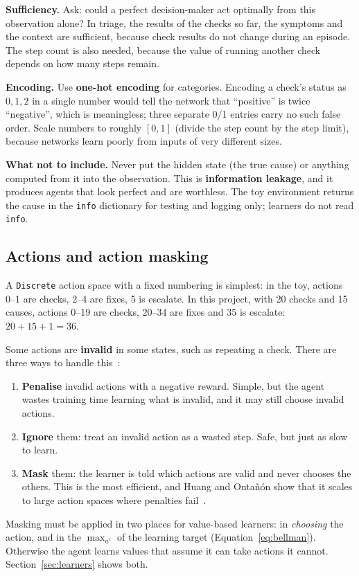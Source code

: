 \documentclass[11pt,a4paper]{article}
\begin{document}
\textbf{Sufficiency.} Ask: could a perfect decision-maker act optimally from this observation alone? In triage, the results of the checks so far, the symptoms and the context are sufficient, because check results do not change during an episode. The step count is also needed, because the value of running another check depends on how many steps remain.

\textbf{Encoding.} Use \textbf{one-hot encoding} for categories. Encoding a check's status as $0, 1, 2$ in a single number would tell the network that ``positive'' is twice ``negative'', which is meaningless; three separate 0/1 entries carry no such false order. Scale numbers to roughly $[0, 1]$ (divide the step count by the step limit), because networks learn poorly from inputs of very different sizes.

\textbf{What not to include.} Never put the hidden state (the true cause) or anything computed from it into the observation. This is \textbf{information leakage}, and it produces agents that look perfect and are worthless. The toy environment returns the cause in the \texttt{info} dictionary for testing and logging only; learners do not read \texttt{info}.

\subsection{Actions and action masking}
\label{sec:masking}
A \texttt{Discrete} action space with a fixed numbering is simplest: in the toy, actions 0--1 are checks, 2--4 are fixes, 5 is escalate. In this project, with 20 checks and 15 causes, actions 0--19 are checks, 20--34 are fixes and 35 is escalate: $20 + 15 + 1 = 36$.

Some actions are \textbf{invalid} in some states, such as repeating a check. There are three ways to handle this~\cite{huang}:
\begin{enumerate}
  \item \textbf{Penalise} invalid actions with a negative reward. Simple, but the agent wastes training time learning what is invalid, and it may still choose invalid actions.
  \item \textbf{Ignore} them: treat an invalid action as a wasted step. Safe, but just as slow to learn.
  \item \textbf{Mask} them: the learner is told which actions are valid and never chooses the others. This is the most efficient, and Huang and Onta\~n\'on show that it scales to large action spaces where penalties fail~\cite{huang}.
\end{enumerate}
Masking must be applied in two places for value-based learners: in \emph{choosing} the action, and in the $\max_{a'}$ of the learning target (Equation~\ref{eq:bellman}). Otherwise the agent learns values that assume it can take actions it cannot. Section~\ref{sec:learners} shows both.
\end{document}
